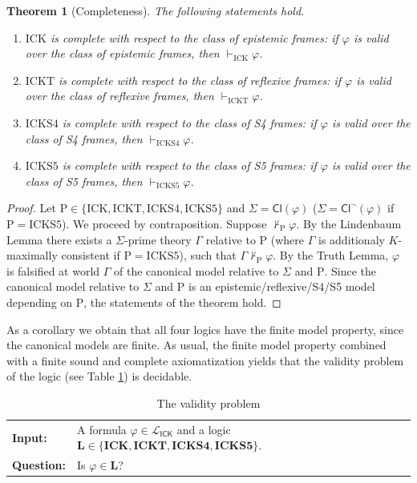 \documentclass{myifcolog}
\newcommand{\K}{K}
\newcommand\Cl {\mathsf{Cl}}
\newcommand{\ICK}{\mathsf{ICK}}
\newcommand{\LICK}{\mathcal{L}_{\ICK}}
\newcommand{\hick}{\mathrm{ICK}}
\newcommand{\hickt}{\mathrm{ICKT}}
\newcommand{\hicks}{\mathrm{ICKS4}}
\newcommand{\hickss}{\mathrm{ICKS5}}
\newcommand{\hickp}{\mathrm{P}}
\newtheorem{theorem}{Theorem}
\numberwithin{theorem}{section}
\begin{document}
\begin{theorem}[Completeness]\label{t: completeness of Hilbert style system} The following statements hold.
    \begin{enumerate}
        \item $\hick$ is complete with respect to the class of epistemic frames: if $\varphi$ is valid over the class of epistemic frames, then $\vdash_\hick \varphi$.
        \item $\hickt$ is complete with respect to the class of reflexive frames: if $\varphi$ is valid over the class of reflexive frames, then $\vdash_\hickt \varphi$.
        \item $\hicks$ is complete with respect to the class of S4 frames: if $\varphi$ is valid over the class of S4 frames, then $\vdash_\hicks \varphi$.
        \item$\hickss$ is complete with respect to the class of S5 frames: if $\varphi$ is valid over the class of S5 frames, then $\vdash_\hickss \varphi$.
    \end{enumerate}
\end{theorem}
\begin{proof}
    Let $\hickp \in \{\hick, \hickt, \hicks, \hickss \}$ and $\Sigma = \Cl(\varphi)$ ($\Sigma = \Cl^\neg(\varphi)$ if $\hickp = \hickss$). We proceed by contraposition. Suppose $\not \vdash_\mathrm{P} \varphi$. By the Lindenbaum Lemma there exists a $\Sigma$-prime theory $\Gamma$ relative to $\hickp$ (where $\Gamma$ is additionaly $\K$-maximally consistent if $\hickp = \hickss$), such that $\Gamma \not \vdash_\mathrm{P} \varphi$. By the Truth Lemma, $\varphi$ is falsified at world $\Gamma$ of the canonical model relative to $\Sigma$ and $\mathrm{P}$. Since the canonical model relative to $\Sigma$ and $\hickp$ is an epistemic/reflexive/S4/S5 model depending on $\hickp$, the statements of the theorem hold.
\end{proof}

As a corollary we obtain that all four logics have the finite model property, since the canonical models are finite. As usual, the finite model property combined with a finite sound and complete axiomatization yields that the validity problem of the logic (see Table \ref{tab:validity problem}) is decidable.

\begin{table}[t]
    \centering
    \begin{tabular}{|l l|}
    \hline
        \textbf{Input:} &  A formula $\varphi \in \LICK$ and a logic $\mathbf{L} \in \{\mathbf{ICK}, \mathbf{ICKT}, \mathbf{ICKS4}, \mathbf{ICKS5}\}$. \\
         \textbf{Question:} &  Is $\varphi \in \mathbf{L}$? \\
         \hline
    \end{tabular}
    \caption{The validity problem}
    \label{tab:validity problem}
\end{table}
\end{document}
